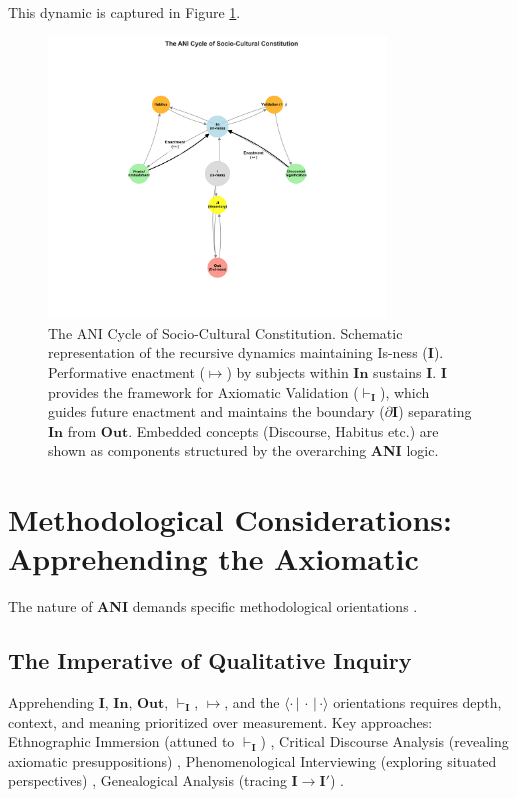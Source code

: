 \documentclass{article}
\newcommand{\ANI}{\textbf{ANI}}             %
\newcommand{\Isness}{\mathbf{I}}            %
\newcommand{\Inness}{\mathbf{In}}           %
\newcommand{\Outness}{\mathbf{Out}}         %
\newcommand{\enactment}{\ensuremath{\mapsto}} %
\newcommand{\validates}[1]{\ensuremath{\vdash_{#1}}} %
\newcommand{\boundary}[1]{\ensuremath{\partial #1}} %
\newcommand{\orientation}[3]{\ensuremath{\langle #1 \,|\, #2 \,|\, #3 \rangle}} %
\begin{document}
This dynamic is captured in Figure \ref{fig:ani_cycle}.

\begin{figure}[h!]
    \centering
    \includegraphics[width=0.8\textwidth]{figures/ani_figure1_cycle_diagram.png}
    \caption{The ANI Cycle of Socio-Cultural Constitution. Schematic representation of the recursive dynamics maintaining Is-ness ($\Isness$). Performative enactment ($\enactment$) by subjects within $\Inness$ sustains $\Isness$. $\Isness$ provides the framework for Axiomatic Validation ($\validates{\Isness}$), which guides future enactment and maintains the boundary ($\boundary{\Isness}$) separating $\Inness$ from $\Outness$. Embedded concepts (Discourse, Habitus etc.) are shown as components structured by the overarching \ANI{} logic.}
    \label{fig:ani_cycle}
\end{figure}

\section{Methodological Considerations: Apprehending the Axiomatic}

The nature of \ANI{} demands specific methodological orientations \citep{DenzinLincoln2011}.

\subsection{The Imperative of Qualitative Inquiry}

Apprehending $\Isness$, $\Inness$, $\Outness$, $\validates{\Isness}$, $\enactment$, and the $\orientation{\cdot}{\cdot}{\cdot}$ orientations requires depth, context, and meaning prioritized over measurement. Key approaches: Ethnographic Immersion (attuned to $\validates{\Isness}$) \citep{Geertz1973}, Critical Discourse Analysis (revealing axiomatic presuppositions) \citep{Foucault1972}, Phenomenological Interviewing (exploring situated perspectives) \citep{Schutz1967}, Genealogical Analysis (tracing $\Isness \rightarrow \Isness'$) \citep{Foucault1970}.
\end{document}
